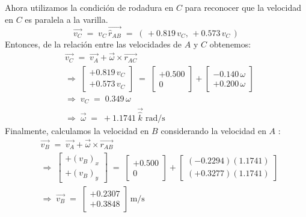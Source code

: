 \documentclass[ a4paper, twoside, 11pt]{article}
\begin{document}
\begin{problem}
Ahora utilizamos la condici\'on de rodadura en $C$ para reconocer que la velocidad en $C$ es paralela a la varilla. \Iec
\[
\vec{v_C}
\; = \; v_C \, \vec{\hat{r}_{AB}}
\; = \; ( \, +0.819 \, v_C, \, +0.573 \, v_C \, )
\]
Entonces, de la relaci\'on entre las velocidades de $A$ y $C$ obtenemos: 
\begin{align*}
& \vec{v_C} \; = \; \vec{v_A} + \vec{\omega} \times \vec{r_{AC}} \\[1ex]
& \Longrightarrow \; \left[ \begin{array}{c}
+0.819 \, v_C \\ +0.573 \, v_C
\end{array} \right] \; = \;
\left[ \begin{array}{c}
+0.500 \\ 0
\end{array} \right] + 
\left[ \begin{array}{c}
-0.140 \, \omega \\ +0.200 \, \omega
\end{array} \right] \\[1ex]
& \Longrightarrow \; v_C \; = \; 0.349 \, \omega \\
& \Longrightarrow \; \vec{\omega} \; = \; +1.1741 \, \vec{\hat{k}} \; \text{rad/s}
\end{align*}
Finalmente, calculamos la velocidad en $B$ considerando la velocidad en $A$ :
\begin{align*}
& \vec{v_B} \; = \; \vec{v_A} + \vec{\omega} \times \vec{r_{AB}} \\[1ex]
& \Longrightarrow \; \left[ \begin{array}{c}
+(v_B)_x \\ +(v_B)_y
\end{array} \right] \; = \;
\left[ \begin{array}{c}
+0.500 \\ 0
\end{array} \right] + 
\left[ \begin{array}{c}
(-0.2294)(1.1741) \\ (+0.3277)(1.1741)
\end{array} \right] \\[1ex]
& \Longrightarrow \; \vec{v_B} \; = \; 
\left[ \begin{array}{c}
+0.2307 \\ +0.3848
\end{array} \right] \, \text{m/s}
\end{align*}

\end{problem}
\fullskip
\end{document}
